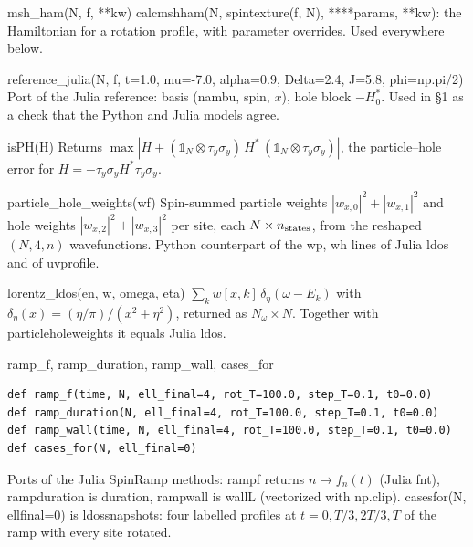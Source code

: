 \documentclass[11pt]{article}
\newcommand{\codeus}{\textunderscore\allowbreak}
\renewcommand{\code}[1]{{\ttfamily\let\_\codeus #1}}
\begin{document}
\begin{function}{msh\_ham(N, f, **kw)}
\code{calc\_msh\_ham(N, spin\_texture(f, N), **{**params, **kw})}: the Hamiltonian for a rotation profile, with parameter overrides. Used everywhere below.
\end{function}

\begin{function}{reference\_julia(N, f, t=1.0, mu=-7.0, alpha=0.9, Delta=2.4, J=5.8, phi=np.pi/2)}
Port of the Julia \code{reference}: basis (nambu, spin, $x$), hole block $-H_0^*$. Used in §1 as a check that the Python and Julia models agree.
\end{function}

\begin{function}{isPH(H)}
Returns $\max|H+(\mathbb 1_N\otimes\tau_y\sigma_y)\,H^*\,(\mathbb 1_N\otimes\tau_y\sigma_y)|$, the particle–hole error for $H=-\tau_y\sigma_yH^*\tau_y\sigma_y$.
\end{function}

\begin{function}{particle\_hole\_weights(wf)}
Spin-summed particle weights $|w_{x,0}|^2+|w_{x,1}|^2$ and hole weights $|w_{x,2}|^2+|w_{x,3}|^2$ per site, each $N\times n_{\rm states}$, from the reshaped $(N,4,n)$ wavefunctions. Python counterpart of the \code{wp}, \code{wh} lines of Julia \code{ldos} and of \code{uv\_profile}.
\end{function}

\begin{function}{lorentz\_ldos(en, w, omega, eta)}
$\sum_kw[x,k]\,\delta_\eta(\omega-E_k)$ with $\delta_\eta(x)=(\eta/\pi)/(x^2+\eta^2)$, returned as $N_\omega\times N$. Together with \code{particle\_hole\_weights} it equals Julia \code{ldos}.
\end{function}

\begin{function}{ramp\_f, ramp\_duration, ramp\_wall, cases\_for}
\begin{Verbatim}
def ramp_f(time, N, ell_final=4, rot_T=100.0, step_T=0.1, t0=0.0)
def ramp_duration(N, ell_final=4, rot_T=100.0, step_T=0.1, t0=0.0)
def ramp_wall(time, N, ell_final=4, rot_T=100.0, step_T=0.1, t0=0.0)
def cases_for(N, ell_final=0)
\end{Verbatim}
Ports of the Julia \code{SpinRamp} methods: \code{ramp\_f} returns $n\mapsto f_n(t)$ (Julia \code{f\_nt}), \code{ramp\_duration} is \code{duration}, \code{ramp\_wall} is \code{wall\_L} (vectorized with \code{np.clip}). \code{cases\_for(N, ell\_final=0)} is \code{ldos\_snapshots}: four labelled profiles at $t=0,T/3,2T/3,T$ of the ramp with every site rotated.
\end{function}
\end{document}
